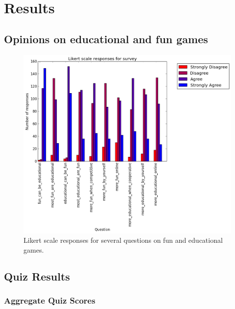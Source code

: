 \section{Results}

	\subsection{Opinions on educational and fun games}
		\begin{figure}[h] 
		\centering 
		\includegraphics[width=\textwidth]{survey_likert.png} 
		\caption{Likert scale responses for several questions on fun and educational games.}
		\end{figure}


	\subsection{Quiz Results}

		\subsubsection{Aggregate Quiz Scores}

